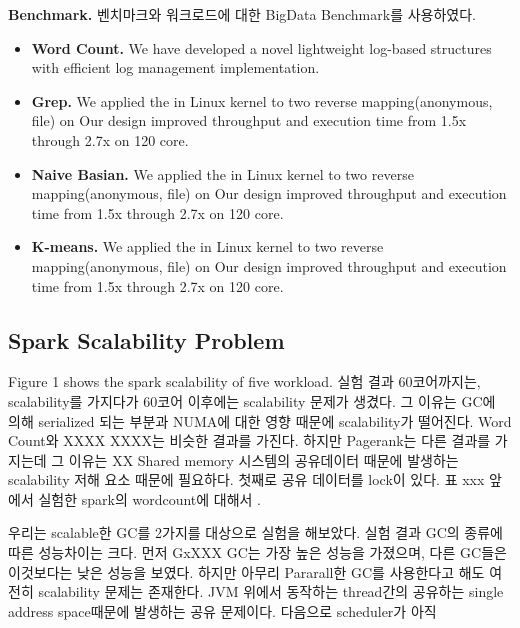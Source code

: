 \ifkor
\noindent
\textbf{Benchmark.} 벤치마크와 워크로드에 대한 BigData Benchmark를 사용하였다.
\begin{itemize}
\item \textbf{Word Count. }We have developed a novel lightweight log-based
structures with efficient log management implementation.
\item \textbf{Grep. }
We applied the in Linux kernel to two reverse mapping(anonymous, file) on
Our design improved throughput and execution time from 1.5x through 2.7x on 120 core.
\item \textbf{Naive Basian. }
We applied the in Linux kernel to two reverse mapping(anonymous, file) on
Our design improved throughput and execution time from 1.5x through 2.7x on 120 core.
\item \textbf{K-means.}
We applied the in Linux kernel to two reverse mapping(anonymous, file) on
Our design improved throughput and execution time from 1.5x through 2.7x on 120 core.
\end{itemize}
\else

\fi


\subsection{Spark Scalability Problem}
\ifkor
Figure 1 shows the spark scalability of five workload.
실험 결과 60코어까지는, scalability를 가지다가 60코어 이후에는 scalability 문제가 생겼다.
그 이유는 GC에 의해 serialized 되는 부분과 NUMA에 대한 영향 때문에 scalability가 떨어진다.
Word Count와 XXXX XXXX는 비슷한 결과를 가진다.
하지만 Pagerank는 다른 결과를 가지는데 그 이유는 XX
Shared memory 시스템의 공유데이터 때문에 발생하는 scalability 저해 요소 때문에 필요하다.
첫째로 공유 데이터를 lock이 있다. 표 xxx 앞에서 실험한 spark의 wordcount에 대해서 .
\else

\fi

\ifkor
우리는 scalable한 GC를 2가지를 대상으로 실험을 해보았다.
실험 결과 GC의 종류에 따른 성능차이는 크다.
먼저 GxXXX GC는 가장 높은 성능을 가졌으며, 다른 GC들은 이것보다는 낮은 성능을
보였다. 
하지만 아무리 Pararall한 GC를 사용한다고 해도 여전히 scalability 문제는 존재한다.
JVM 위에서 동작하는 thread간의 공유하는 single address space때문에 발생하는 공유 문제이다.
다음으로 scheduler가 아직 
\else

